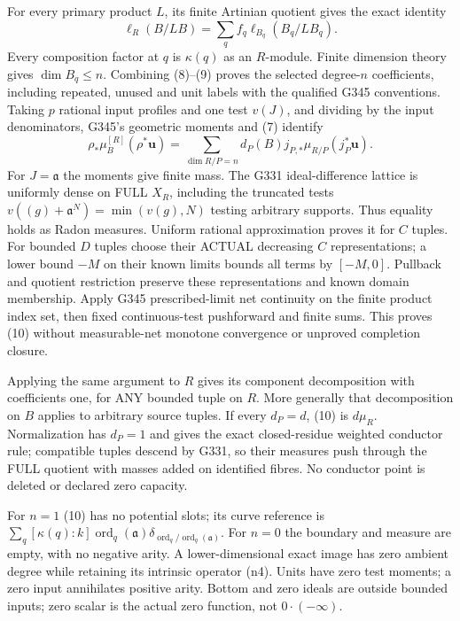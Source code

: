 For every primary product $L$, its finite Artinian quotient gives the exact identity
\[
 \ell_R(B/LB)=\sum_q f_q\ell_{B_q}(B_q/LB_q). \tag{9}
\]
Every composition factor at $q$ is $\kappa(q)$ as an $R$-module. Finite dimension theory gives $\dim B_q\le n$. Combining (8)--(9) proves the selected degree-$n$ coefficients, including repeated, unused and unit labels with the qualified G345 conventions. Taking $p$ rational input profiles and one test $v(J)$, and dividing by the input denominators, G345's geometric moments and (7) identify
\[
 \rho_*\mu_B^{[R]}(\rho^*\boldsymbol u)
 =\sum_{\dim R/P=n}d_P(B)j_{P,*}\mu_{R/P}(j_P^*\boldsymbol u). \tag{10}
\]
For $J=\mathfrak a$ the moments give finite mass. The G331 ideal-difference lattice is uniformly dense on FULL $X_R$, including the truncated tests $v((g)+\mathfrak a^N)=\min(v(g),N)$ testing arbitrary supports. Thus equality holds as Radon measures. Uniform rational approximation proves it for $C$ tuples. For bounded $D$ tuples choose their ACTUAL decreasing $C$ representations; a lower bound $-M$ on their known limits bounds all terms by $[-M,0]$. Pullback and quotient restriction preserve these representations and known domain membership. Apply G345 prescribed-limit net continuity on the finite product index set, then fixed continuous-test pushforward and finite sums. This proves (10) without measurable-net monotone convergence or unproved completion closure.

Applying the same argument to $R$ gives its component decomposition with coefficients one, for ANY bounded tuple on $R$. More generally that decomposition on $B$ applies to arbitrary source tuples. If every $d_P=d$, (10) is $d\mu_R$. Normalization has $d_P=1$ and gives the exact closed-residue weighted conductor rule; compatible tuples descend by G331, so their measures push through the FULL quotient with masses added on identified fibres. No conductor point is deleted or declared zero capacity.

For $n=1$ (10) has no potential slots; its curve reference is $\sum_q[\kappa(q):k]\operatorname{ord}_q(\mathfrak a)\delta_{\operatorname{ord}_q/\operatorname{ord}_q(\mathfrak a)}$. For $n=0$ the boundary and measure are empty, with no negative arity. A lower-dimensional exact image has zero ambient degree while retaining its intrinsic operator (n4). Units have zero test moments; a zero input annihilates positive arity. Bottom and zero ideals are outside bounded inputs; zero scalar is the actual zero function, not $0\cdot(-\infty)$.
